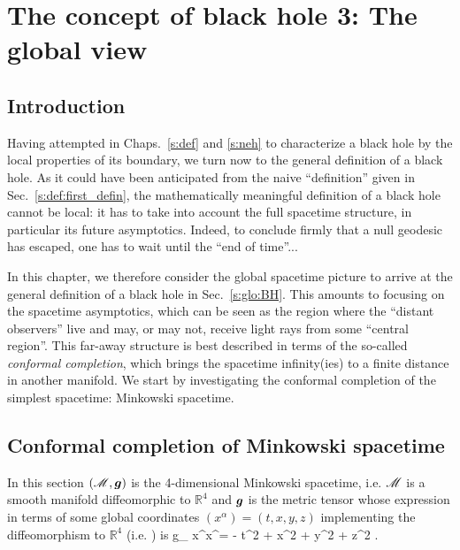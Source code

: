 \chapter{The concept of black hole 3: The global view}
\label{s:glo}

\minitoc

\section{Introduction}

Having attempted in Chaps.~\ref{s:def} and \ref{s:neh} to characterize a black hole by the local
properties of its boundary, we turn now to the general definition of a black
hole. As it could have been anticipated from the naive ``definition'' given
in Sec.~\ref{s:def:first_defin}, the mathematically meaningful definition
of a black hole cannot be local: it has to take into account the full
spacetime structure, in particular its future asymptotics. Indeed, to conclude
firmly that a null geodesic has escaped, one has to wait until the ``end
of time''...

In this chapter, we therefore consider the global spacetime picture to
arrive at the general definition of a black hole in
Sec.~\ref{s:glo:BH}.
This amounts to focusing on the
spacetime asymptotics, which can be seen as
the region where the ``distant observers'' live and may, or may not, receive
light rays from some ``central region''. This far-away structure is best
described in terms of the so-called \emph{conformal completion}, which brings
the spacetime infinity(ies) to a finite distance in another manifold.
We start by investigating the conformal completion of the simplest
spacetime: Minkowski spacetime.


\section{Conformal completion of Minkowski spacetime} \label{s:glo:conf_Mink}

In this section $(\mathscr{M},\bm{g})$ is the 4-dimensional Minkowski spacetime,
i.e. $\mathscr{M}$ is a smooth manifold diffeomorphic to $\mathbb{R}^4$ and $\bm{g}$
is the metric tensor whose expression in terms of some global coordinates
$(x^\alpha) = (t, x, y, z)$ implementing the diffeomorphism to $\mathbb{R}^4$
(i.e. )
is
\be \label{e:glo:Mink_metric}
    g_{\mu\nu} \D x^\mu \D x^\nu = - \D t^2 + \D x^2 + \D y^2 + \D z^2 .
\ee

